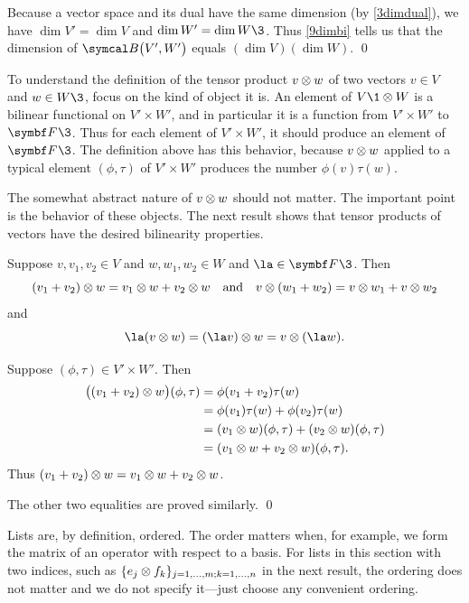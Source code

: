 \proof
 Because a vector space and its dual have the same dimension (by \ref{3dimdual}), we have $\dim V' = \dim V$ and $\dim W' = \dim W\3$. Thus \ref{9dimbi} tells us that the dimension of $\B\paren[\big]{V', W'}$ equals $(\dim V)(\dim W)$.
\qed

To understand the definition of the tensor product $v \tensor w$ of two vectors $v \in V$ and $w \in W\3$, focus on the kind of object it is. An element of $V\1 \tensor W$ is a bilinear functional on $V'\! \times W'\!$, and in particular it is a function from $V'\! \times W'$ to $\F{}\3$. Thus for each element of $V'\! \times W'\!$, it should produce an element of $\F{}\3$. The definition above has this behavior, because $v \tensor w$ applied to a typical element $(\phi, \tau)$ of $V'\! \times W'$ produces the number $\phi(v) \tau(w)$.

The somewhat abstract nature of $v \tensor w$ should not matter. The important point is the behavior of these objects. The next result shows that tensor products of vectors have the desired bilinearity properties.

{Suppose $v, v_1, v_2 \in V$ and $w, w_1, w_2 \in W$ and $\la \in \F{}\3$. Then
\[
(v_1 + v_2) \tensor w = v_1 \tensor w + v_2 \tensor w
\andd
v \tensor (w_1 + w_2) = v \tensor w_1 + v \tensor w_2
\]
and
\[
\la(v \tensor w) = (\la v) \tensor w = v \tensor (\la w).
\]}

\proof
Suppose $(\phi, \tau) \in V'\! \times W'\!$. Then
\begin{align*}
\paren[\big]{ (v_1 + v_2) \tensor w }(\phi, \tau) &= \phi( v_1 + v_2) \tau(w)\\
&= \phi(v_1) \tau(w) + \phi(v_2) \tau(w) \\
&= (v_1 \tensor w)(\phi, \tau) + (v_2 \tensor w)(\phi, \tau)\\
&= (v_1 \tensor w + v_2 \tensor w)(\phi, \tau).
\end{align*}
Thus $(v_1 + v_2) \tensor w = v_1 \tensor w + v_2 \tensor w$.

The other two equalities are proved similarly.
\qed

\pagebreak[3]

Lists are, by definition, ordered. The order matters when, for example, we form the matrix of an operator with respect to a basis. For lists in this section with two indices, such as $\br{e_j \tensor f_k}_{j = 1, \ldots, m; k = 1, \ldots, n}$ in the next result,  the ordering does not matter and we do not specify it---just choose any convenient ordering.

